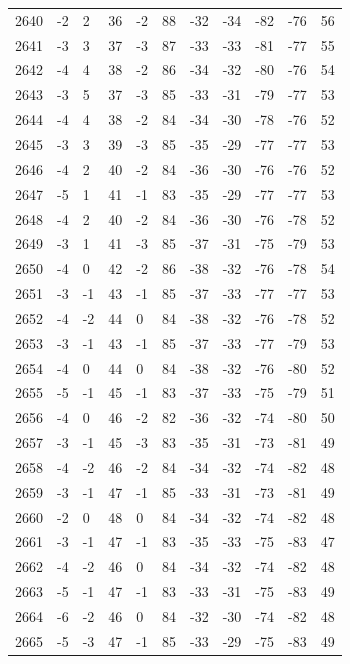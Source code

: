 \begin{table}[H]
\begin{tabular}{lllllllllll}
2640 & -2 & 2 & 36 & -2 & 88 & -32 & -34 & -82 & -76 & 56 \\
2641 & -3 & 3 & 37 & -3 & 87 & -33 & -33 & -81 & -77 & 55 \\
2642 & -4 & 4 & 38 & -2 & 86 & -34 & -32 & -80 & -76 & 54 \\
2643 & -3 & 5 & 37 & -3 & 85 & -33 & -31 & -79 & -77 & 53 \\
2644 & -4 & 4 & 38 & -2 & 84 & -34 & -30 & -78 & -76 & 52 \\
2645 & -3 & 3 & 39 & -3 & 85 & -35 & -29 & -77 & -77 & 53 \\
2646 & -4 & 2 & 40 & -2 & 84 & -36 & -30 & -76 & -76 & 52 \\
2647 & -5 & 1 & 41 & -1 & 83 & -35 & -29 & -77 & -77 & 53 \\
2648 & -4 & 2 & 40 & -2 & 84 & -36 & -30 & -76 & -78 & 52 \\
2649 & -3 & 1 & 41 & -3 & 85 & -37 & -31 & -75 & -79 & 53 \\
2650 & -4 & 0 & 42 & -2 & 86 & -38 & -32 & -76 & -78 & 54 \\
2651 & -3 & -1 & 43 & -1 & 85 & -37 & -33 & -77 & -77 & 53 \\
2652 & -4 & -2 & 44 & 0 & 84 & -38 & -32 & -76 & -78 & 52 \\
2653 & -3 & -1 & 43 & -1 & 85 & -37 & -33 & -77 & -79 & 53 \\
2654 & -4 & 0 & 44 & 0 & 84 & -38 & -32 & -76 & -80 & 52 \\
2655 & -5 & -1 & 45 & -1 & 83 & -37 & -33 & -75 & -79 & 51 \\
2656 & -4 & 0 & 46 & -2 & 82 & -36 & -32 & -74 & -80 & 50 \\
2657 & -3 & -1 & 45 & -3 & 83 & -35 & -31 & -73 & -81 & 49 \\
2658 & -4 & -2 & 46 & -2 & 84 & -34 & -32 & -74 & -82 & 48 \\
2659 & -3 & -1 & 47 & -1 & 85 & -33 & -31 & -73 & -81 & 49 \\
2660 & -2 & 0 & 48 & 0 & 84 & -34 & -32 & -74 & -82 & 48 \\
2661 & -3 & -1 & 47 & -1 & 83 & -35 & -33 & -75 & -83 & 47 \\
2662 & -4 & -2 & 46 & 0 & 84 & -34 & -32 & -74 & -82 & 48 \\
2663 & -5 & -1 & 47 & -1 & 83 & -33 & -31 & -75 & -83 & 49 \\
2664 & -6 & -2 & 46 & 0 & 84 & -32 & -30 & -74 & -82 & 48 \\
2665 & -5 & -3 & 47 & -1 & 85 & -33 & -29 & -75 & -83 & 49 \\

\end{tabular}
\end{table}
